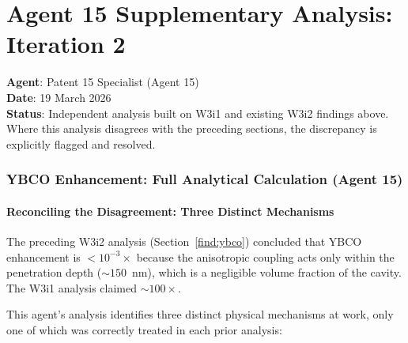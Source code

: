 \documentclass[11pt]{article}
\begin{document}

\newpage
\part*{Agent 15 Supplementary Analysis: Iteration 2}

\noindent\textbf{Agent}: Patent 15 Specialist (Agent 15) \\
\textbf{Date}: 19 March 2026 \\
\textbf{Status}: Independent analysis built on W3i1 and existing W3i2 findings above.
Where this analysis disagrees with the preceding sections, the discrepancy is
explicitly flagged and resolved.

\section{YBCO Enhancement: Full Analytical Calculation (Agent 15)}
\label{sec:a15-ybco}

\subsection{Reconciling the Disagreement: Three Distinct Mechanisms}

The preceding W3i2 analysis (Section~\ref{find:ybco}) concluded that YBCO
enhancement is $< 10^{-3}\times$ because the anisotropic coupling acts only
within the penetration depth ($\sim 150$~nm), which is a negligible volume
fraction of the cavity. The W3i1 analysis claimed $\sim 100\times$.

This agent's analysis identifies three distinct physical mechanisms at work,
only one of which was correctly treated in each prior analysis:
\end{document}
